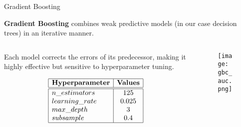\begin{frame}{Gradient Boosting}

    \textbf{Gradient Boosting} combines weak predictive models (in our case decision trees) in an iterative manner.

    \begin{columns}
        \begin{column}{0.45\textwidth}
            Each model corrects the errors of its predecessor, making it highly effective but sensitive to hyperparameter tuning.

            \vspace{-0.1em}

            {\small
            $$
            \begin{array}{|l|c|}
                \hline
                \textbf{Hyperparameter} & \textbf{Values} \\
                \hline
                \hline
                n\_estimators & 125 \\
                learning\_rate & 0.025 \\
                max\_depth & 3 \\
                subsample & 0.4 \\
                \hline
            \end{array}
            $$
            }
        \end{column}
            \begin{column}{0.55\textwidth}
                \begin{figure}
                    \centering
                    \vfill
                    \texttt{[image: gbc\_auc.png]}
                \end{figure}
            \end{column}
    \end{columns}

\end{frame}

